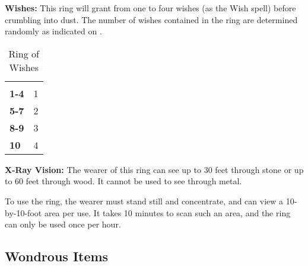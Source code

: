 \begin{multicols*}{2}
\textbf{Wishes:} This ring will grant from one to four wishes (as the Wish spell) before crumbling into dust. The number of wishes contained in the ring are determined randomly as indicated on .

\begin {table}[H]
  \caption{Ring of Wishes}\label{tab:Ring of Wishes}
  \begin{tabularx}{\columnwidth}{>{\bfseries}YY}
	 & \\
	1-4 & 1\\
	5-7 & 2\\
	8-9 & 3\\
	10 & 4
  \end {tabularx}
\end {table}

\textbf{X-Ray Vision:} The wearer of this ring can see up to 30 feet through stone or up to 60 feet through wood. It cannot be used to see through metal.

To use the ring, the wearer must stand still and concentrate, and can view a 10-by-10-foot area per use. It takes 10 minutes to scan such an area, and the ring can only be used once per hour.

\subsection{Wondrous Items}


\end{multicols*}
